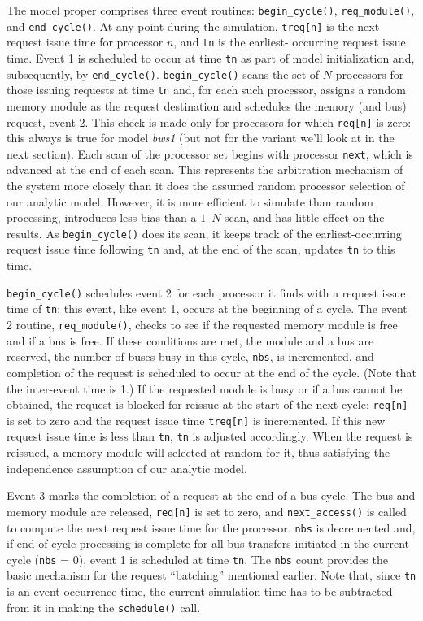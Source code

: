 The model proper comprises three event routines: \texttt{begin\_cycle()},
\texttt{req\_module()}, and \texttt{end\_cycle()}. At any point during the simulation,
\texttt{treq[n]} is the next request issue time for processor $n$, and \texttt{tn} is the earliest-
occurring request issue time. Event 1 is scheduled to occur at time \texttt{tn} as part of
model initialization and, subsequently, by \texttt{end\_cycle()}. \texttt{begin\_cycle()}
scans the set of $N$ processors for those issuing requests at time \texttt{tn} and, for each
such processor, assigns a random memory module as the request destination
and schedules the memory (and bus) request, event 2. This check is made only
for processors for which \texttt{req[n]} is zero: this always is true for model \emph{bws1}
(but not for the variant we'll look at in the next section). Each scan of the
processor set begins with processor \texttt{next}, which is advanced at the end of
each scan. This represents the arbitration mechanism of the system more
closely than it does the assumed random processor selection of our analytic
model. However, it is more efficient to simulate than random processing,
introduces less bias than a $1$--$N$ scan, and has little effect on the results. As
\texttt{begin\_cycle()} does its scan, it keeps track of the earliest-occurring request
issue time following \texttt{tn} and, at the end of the scan, updates \texttt{tn} to this time.

\texttt{begin\_cycle()} schedules event 2 for each processor it finds with a
request issue time of \texttt{tn}: this event, like event 1, occurs at the beginning of a
cycle. The event 2 routine, \texttt{req\_module()}, checks to see if the requested
memory module is free and if a bus is free. If these conditions are met, the
module and a bus are reserved, the number of buses busy in this cycle, \texttt{nbs}, is
incremented, and completion of the request is scheduled to occur at the end of
the cycle. (Note that the inter-event time is 1.) If the requested module is
busy or if a bus cannot be obtained, the request is blocked for reissue at the
start of the next cycle: \texttt{req[n]} is set to zero and the request issue time
\texttt{treq[n]} is incremented. If this new request issue time is less than \texttt{tn}, \texttt{tn} is
adjusted accordingly. When the request is reissued, a memory module will
selected at random for it, thus satisfying the independence assumption of our
analytic model.

Event 3 marks the completion of a request at the end of a bus cycle. The
bus and memory module are released, \texttt{req[n]} is set to zero, and
\texttt{next\_access()} is called to compute the next request issue time for the processor.
\texttt{nbs} is decremented and, if end-of-cycle processing is complete for all
bus transfers initiated in the current cycle (\texttt{nbs} = 0), event 1 is scheduled at
time \texttt{tn}. The \texttt{nbs} count provides the basic mechanism for the request
``batching'' mentioned earlier. Note that, since \texttt{tn} is an event occurrence
time, the current simulation time has to be subtracted from it in making the
\texttt{schedule()} call.

